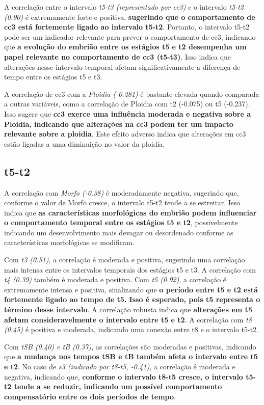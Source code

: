 A correlação entre o intervalo \textit{t5-t3 (representado por cc3)} e o intervalo \textit{t5-t2 (0.90)} é extremamente forte e positiva, \textbf{sugerindo que o comportamento de cc3 está fortemente ligado ao intervalo t5-t2}. Portanto, o intervalo t5-t2 pode ser um indicador relevante para prever o comportamento de cc3, indicando que \textbf{a evolução do embrião entre os estágios t5 e t2 desempenha um papel relevante no comportamento de cc3 (t5-t3)}. Isso indica que alterações nesse intervalo temporal afetam significativamente a diferença de tempo entre os estágios t5 e t3. 

A correlação de cc3 com a \textit{Ploidia (-0.281)} é bastante elevada quando comparada a outras variáveis, como a correlação de Ploidia com t2 (-0.075) ou t5 (-0.237). Isso sugere que \textbf{cc3 exerce uma influência moderada e negativa sobre a Ploidia, indicando que alterações na cc3 podem ter um impacto relevante sobre a ploidia}. Este efeito adverso indica que alterações em cc3 estão ligadas a uma diminuição no valor da ploidia.

\subsection*{t5-t2}
A correlação com \textit{Morfo (-0.38)} é moderadamente negativa, sugerindo que, conforme o valor de Morfo cresce, o intervalo t5-t2 tende a se estreitar. Isso indica que \textbf{as características morfológicas do embrião podem influenciar o comportamento temporal entre os estágios t5 e t2}, possivelmente indicando um desenvolvimento mais devagar ou desordenado conforme as características morfológicas se modificam.

Com \textit{t3 (0.51)}, a correlação é moderada e positiva, sugerindo uma correlação mais intensa entre os intervalos temporais dos estágios t5 e t3. A correlação com \textit{t4 (0.39)} também é moderada e positiva. Com \textit{t5 (0.92)}, a correlação é extremamente intensa e positiva, sinalizando que \textbf{o período entre t5 e t2 está fortemente ligado ao tempo de t5. Isso é esperado, pois t5 representa o término desse intervalo}. A correlação robusta indica que \textbf{alterações em t5 afetam consideravelmente o intervalo entre t5 e t2}. A correlação com \textit{t8 (0.45)} é positiva e moderada, indicando uma conexão entre t8 e o intervalo t5-t2.

Com \textit{tSB (0.40) e tB (0.37)}, as correlações são moderadas e positivas, indicando que \textbf{a mudança nos tempos tSB e tB também afeta o intervalo entre t5 e t2}. No caso de \textit{s3 (indicado por t8-t5, -0.41)}, a correlação é moderada e negativa, indicando que, \textbf{conforme o intervalo t8-t5 cresce, o intervalo t5-t2 tende a se reduzir, indicando um possível comportamento compensatório entre os dois períodos de tempo}.

